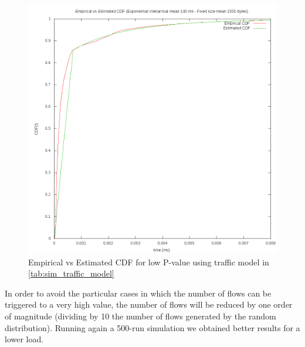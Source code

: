 \begin{figure}[h!]
	\centering
	\includegraphics[scale=0.28, trim = 0mm 0mm 0mm 0mm, clip]{images/results/GlobalView/flows/high_load/bad_p}
	\caption{Empirical vs Estimated CDF for low P-value using traffic model in \ref{tab:sim_traffic_model}}
	\label{fig:high_load_bad_p}
\end{figure}

In order to avoid the particular cases in which the number of flows can be triggered to a very high value, the number of flows will be reduced by one order of magnitude (dividing by 10 the number of flows generated by the random distribution). Running again a 500-run simulation we obtained better results for a lower load.


 

